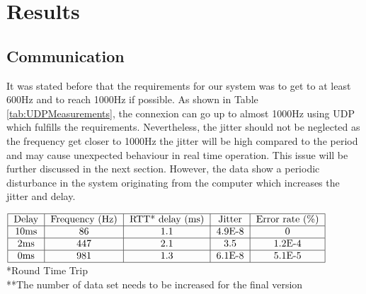 \section{Results}

\subsection{Communication}

 It was stated before that the requirements for our system was to get to at least 600Hz and to reach 1000Hz if possible. As shown in Table \ref{tab:UDPMeasurements}, the connexion can go up to almost 1000Hz using UDP which fulfills the requirements. Nevertheless, the jitter should not be neglected as the frequency get closer to 1000Hz the jitter will be high compared to the period and may cause unexpected behaviour in real time operation. This issue will be further discussed in the next section. However, the data show a periodic disturbance in the system originating from the computer which increases the jitter and delay. %


\begin{table}[!t]
  $\begin{tabular}{|c|c|c|c|c|c|}
    \hline
    \text{Delay} & \text{Frequency (Hz)} & \text{RTT* delay (ms)} & \text{Jitter} & \text{Error rate (\%)}\\
    \hline
    10ms & 86 & 1.1 & 4.9E-8 & 0 \\
    \hline
    2ms & 447 & 2.1 & 3.5 & 1.2E-4 \\
    \hline
    0ms & 981 & 1.3 & 6.1E-8 & 5.1E-5 \\
    \hline
  \end{tabular}$
  *Round Time Trip\\
  **The number of data set needs to be increased for the final version
  \caption{UDP**}
  \label{tab:UDPMeasurements}
\end{table}



